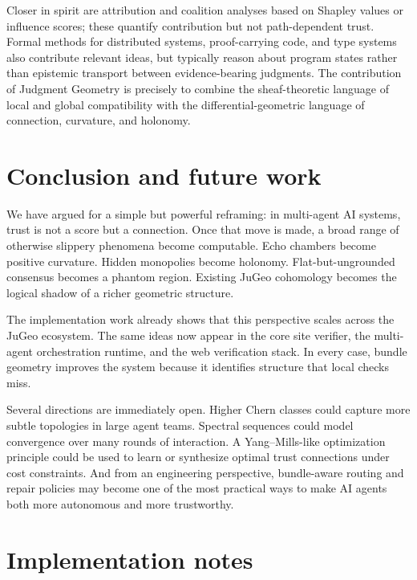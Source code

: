 \documentclass[11pt]{article}
\begin{document}
Closer in spirit are attribution and coalition analyses based on Shapley values
or influence scores; these quantify contribution but not path-dependent trust.
Formal methods for distributed systems, proof-carrying code, and type systems
also contribute relevant ideas, but typically reason about program states rather
than epistemic transport between evidence-bearing judgments.  The contribution of
Judgment Geometry is precisely to combine the sheaf-theoretic language of local
and global compatibility with the differential-geometric language of connection,
curvature, and holonomy.

\section{Conclusion and future work}\label{sec:conclusion}

We have argued for a simple but powerful reframing: in multi-agent AI systems,
trust is not a score but a connection.  Once that move is made, a broad range of
otherwise slippery phenomena become computable.  Echo chambers become positive
curvature.  Hidden monopolies become holonomy.  Flat-but-ungrounded consensus
becomes a phantom region.  Existing JuGeo cohomology becomes the logical shadow
of a richer geometric structure.

The implementation work already shows that this perspective scales across the
JuGeo ecosystem.  The same ideas now appear in the core site verifier, the
multi-agent orchestration runtime, and the web verification stack.  In every
case, bundle geometry improves the system because it identifies structure that
local checks miss.

Several directions are immediately open.  Higher Chern classes could capture
more subtle topologies in large agent teams.  Spectral sequences could model
convergence over many rounds of interaction.  A Yang--Mills-like optimization
principle could be used to learn or synthesize optimal trust connections under
cost constraints.  And from an engineering perspective, bundle-aware routing and
repair policies may become one of the most practical ways to make AI agents both
more autonomous and more trustworthy.

\appendix

\section{Implementation notes}\label{app:impl}
\end{document}
